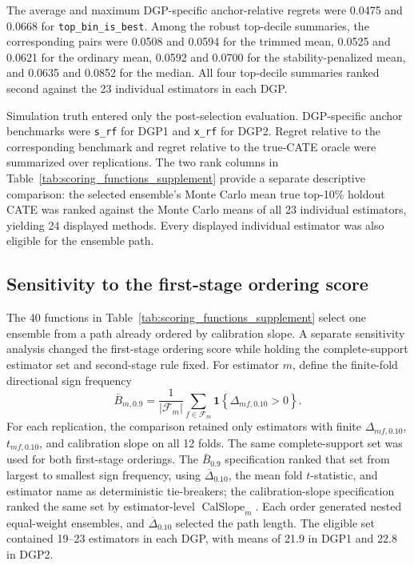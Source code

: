 \documentclass[12pt]{article}
\newcommand{\TargetFrac}{10{\%}\xspace}
\newcommand{\CalSlope}{\ensuremath{\operatorname{CalSlope}}}
\newcommand{\MeanDeltaTopTen}{\ensuremath{\overline{\Delta}_{0.10}}}
\begin{document}
The average and maximum DGP-specific anchor-relative regrets were 0.0475 and 0.0668 for \texttt{top\_bin\_is\_best}. Among the robust top-decile summaries, the corresponding pairs were 0.0508 and 0.0594 for the trimmed mean, 0.0525 and 0.0621 for the ordinary mean, 0.0592 and 0.0700 for the stability-penalized mean, and 0.0635 and 0.0852 for the median. All four top-decile summaries ranked second against the 23 individual estimators in each DGP.

Simulation truth entered only the post-selection evaluation. DGP-specific anchor benchmarks were \texttt{s\_rf} for DGP1 and \texttt{x\_rf} for DGP2. Regret relative to the corresponding benchmark and regret relative to the true-CATE oracle were summarized over replications. The two rank columns in Table~\ref{tab:scoring_functions_supplement} provide a separate descriptive comparison: the selected ensemble's Monte Carlo mean true top-\TargetFrac holdout CATE was ranked against the Monte Carlo means of all 23 individual estimators, yielding 24 displayed methods. Every displayed individual estimator was also eligible for the ensemble path.

\subsection{Sensitivity to the first-stage ordering score}
\label{supp:first_stage_sensitivity}

The 40 functions in Table~\ref{tab:scoring_functions_supplement} select one ensemble from a path already ordered by calibration slope. A separate sensitivity analysis changed the first-stage ordering score while holding the complete-support estimator set and second-stage rule fixed. For estimator $m$, define the finite-fold directional sign frequency
\[
\bar B_{m,0.9}
=
\frac{1}{|\mathcal F_m|}
\sum_{f\in\mathcal F_m}
\mathbf 1\!\left\{\Delta_{mf,0.10}>0\right\}.
\]
For each replication, the comparison retained only estimators with finite $\Delta_{mf,0.10}$, $t_{mf,0.10}$, and calibration slope on all 12 folds. The same complete-support set was used for both first-stage orderings. The $\bar B_{0.9}$ specification ranked that set from largest to smallest sign frequency, using $\overline{\Delta}_{0.10}$, the mean fold $t$-statistic, and estimator name as deterministic tie-breakers; the calibration-slope specification ranked the same set by estimator-level $\CalSlope_m$. Each order generated nested equal-weight ensembles, and $\MeanDeltaTopTen$ selected the path length. The eligible set contained 19--23 estimators in each DGP, with means of 21.9 in DGP1 and 22.8 in DGP2.
\end{document}
